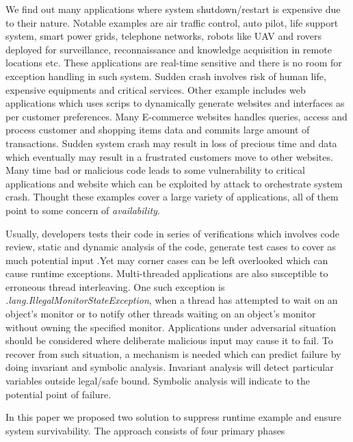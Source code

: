 We find out many applications where system shutdown/restart is expensive due to
their nature.
Notable examples are air traffic control, auto pilot, life support system, smart
power grids, telephone networks, robots like UAV and rovers deployed for
surveillance, reconnaissance and knowledge acquisition in remote locations etc.
These applications are real-time sensitive and there is no room for exception
handling in such system.
Sudden crash involves risk of human life, expensive equipments and critical
services.
Other example includes web applications which uses scrips to dynamically
generate websites and interfaces as per customer preferences.
Many E-commerce websites handles queries, access and process customer and
shopping items data and commits large amount of transactions.
Sudden system crash may result in loss of precious time and data which
eventually may result in a frustrated customers move to other websites.
Many time bad or malicious code leads to some vulnerability to critical
applications and website which can be exploited by attack to orchestrate system
crash. Thought these examples cover a large variety of applications, all of them
point to some concern of \emph{availability}.

Usually, developers tests their code in series of verifications which involves
code review, static and dynamic analysis of the code, generate test cases to
cover as much potential input .Yet may corner cases can be left overlooked which
can cause runtime exceptions.
Multi-threaded applications are also susceptible to erroneous thread
interleaving. One such exception is
\emph{\java.lang.IllegalMonitorStateException}, when a thread has attempted to
wait on an object's monitor or to notify other threads waiting on an object's
monitor without owning the specified monitor. Applications under adversarial
situation should be considered where deliberate malicious input may cause it to
fail. To recover from such situation, a mechanism is needed which can predict
failure by doing invariant and symbolic analysis. Invariant analysis will detect
particular variables outside legal/safe bound. Symbolic analysis will indicate
to the potential point of failure.


In this paper we proposed two solution to suppress runtime example and ensure
system survivability. The approach consists of four primary phases

